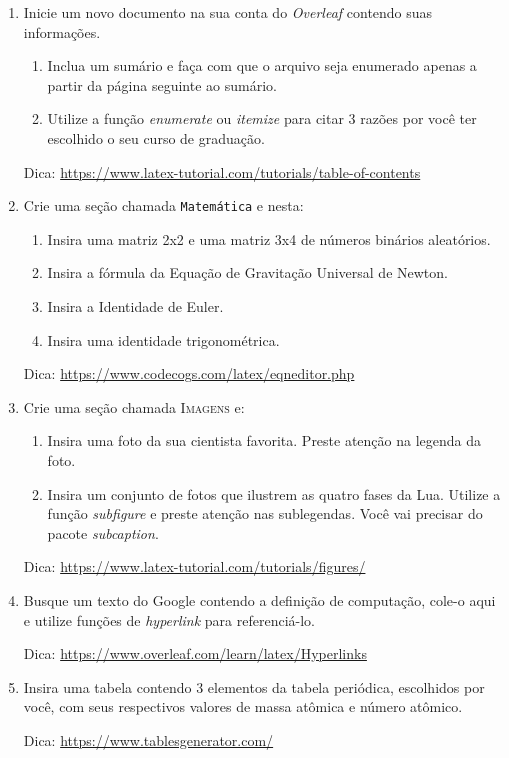 \documentclass{article}
\begin{document}
\begin{enumerate}
    \item Inicie um novo documento na sua conta do \textit{Overleaf} contendo suas informações. 
        \begin{enumerate}
            \item Inclua um sumário e faça com que o arquivo seja enumerado apenas a partir da página seguinte ao sumário.
            
            \item Utilize a função \textit{enumerate} ou \textit{itemize} para citar 3 razões por você ter escolhido o seu curso de graduação.
        \end{enumerate}
         Dica: \url{https://www.latex-tutorial.com/tutorials/table-of-contents}
    
    \item Crie uma seção chamada \texttt{Matemática} e nesta:
        \begin{enumerate}
            \item Insira uma matriz 2x2 e uma matriz 3x4 de números binários aleatórios.
            \item Insira a fórmula da Equação de Gravitação Universal de Newton.
            \item Insira a Identidade de Euler.
            \item Insira uma identidade trigonométrica.
        \end{enumerate}
    Dica: \url{https://www.codecogs.com/latex/eqneditor.php}    
    
    \item Crie uma seção chamada \textsc{Imagens} e:
    \begin{enumerate}
        \item Insira uma foto da sua cientista favorita. Preste atenção na legenda da foto. 
        
        \item Insira um conjunto de fotos que ilustrem as quatro fases da Lua. Utilize a função \textit{subfigure} e preste atenção nas sublegendas. Você vai precisar do pacote \textit{subcaption}.
        \end{enumerate}
        Dica: \url{https://www.latex-tutorial.com/tutorials/figures/}
    
    
    
    \item Busque um texto do Google contendo a definição de computação, cole-o aqui e utilize funções de \textit{hyperlink} para referenciá-lo.
    
    Dica: \url{https://www.overleaf.com/learn/latex/Hyperlinks}
    
    \item Insira uma tabela contendo 3 elementos da tabela periódica, escolhidos por você, com seus respectivos valores de massa atômica e número atômico.
    
    Dica: \url{https://www.tablesgenerator.com/}
\end{enumerate}
\end{document}
